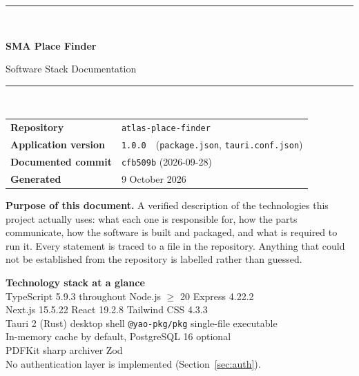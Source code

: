 \documentclass[11pt,a4paper]{report}
\newcommand{\code}[1]{\texttt{\small #1}}
\DeclareRobustCommand{\file}[1]{{\small\nolinkurl{#1}}}
\newcommand{\ver}[1]{\texttt{#1}}
\begin{document}
\begin{titlepage}
\centering
\vspace*{1.2cm}
{\color{cRule}\rule{\textwidth}{1.6pt}}\\[0.5cm]
{\Huge\bfseries SMA Place Finder\par}
\vspace{0.35cm}
{\LARGE Software Stack Documentation\par}
\vspace{0.3cm}
{\color{cRule}\rule{\textwidth}{1.6pt}}\\[1.1cm]

\begin{minipage}{0.84\textwidth}
\centering
\large
\begin{tabular}{@{}ll@{}}
\textbf{Repository}        & \code{atlas-place-finder}\\
\textbf{Application version} & \ver{1.0.0}\ \ \footnotesize(\file{package.json}, \file{tauri.conf.json})\\
\textbf{Documented commit} & \code{cfb509b} (2026-09-28)\\
\textbf{Generated}         & 9 October 2026\\
\end{tabular}
\end{minipage}

\vspace{1.3cm}
\begin{minipage}{0.86\textwidth}
\small
\textbf{Purpose of this document.} A verified description of the technologies this
project actually uses: what each one is responsible for, how the parts
communicate, how the software is built and packaged, and what is required to run
it. Every statement is traced to a file in the repository. Anything that could
not be established from the repository is labelled rather than guessed.
\end{minipage}

\vspace{1.2cm}
\begin{minipage}{0.86\textwidth}
\centering
\setlength{\fboxsep}{9pt}
\colorbox{cSoft}{%
\begin{minipage}{0.93\textwidth}
\small\centering
\textbf{Technology stack at a glance}\\[4pt]
TypeScript 5.9.3 throughout \;\textbullet\; Node.js $\ge$ 20 \;\textbullet\; Express 4.22.2\\
Next.js 15.5.22 \;\textbullet\; React 19.2.8 \;\textbullet\; Tailwind CSS 4.3.3\\
Tauri 2 (Rust) desktop shell \;\textbullet\; \code{@yao-pkg/pkg} single-file executable\\
In-memory cache by default, PostgreSQL 16 optional\\
PDFKit \;\textbullet\; sharp \;\textbullet\; archiver \;\textbullet\; Zod\\[4pt]
\footnotesize No authentication layer is implemented (Section~\ref{sec:auth}).
\end{minipage}}
\end{minipage}


\end{titlepage}
\end{document}
